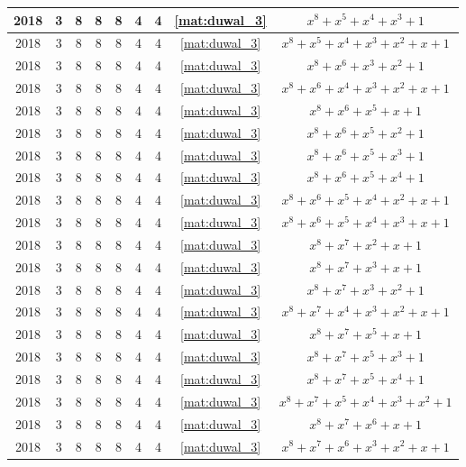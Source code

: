 \begin{longtable}{|c|c|c|c|c|c|c|c|c|}
2018 & 3 & 8 & 8 & 8 & 4 & 4 & \eqref{mat:duwal_3} & $x^8 + x^5 + x^4 + x^3 + 1$ \\ \hline 
2018 & 3 & 8 & 8 & 8 & 4 & 4 & \eqref{mat:duwal_3} & $x^8 + x^5 + x^4 + x^3 + x^2 + x + 1$ \\ \hline 
2018 & 3 & 8 & 8 & 8 & 4 & 4 & \eqref{mat:duwal_3} & $x^8 + x^6 + x^3 + x^2 + 1$ \\ \hline 
2018 & 3 & 8 & 8 & 8 & 4 & 4 & \eqref{mat:duwal_3} & $x^8 + x^6 + x^4 + x^3 + x^2 + x + 1$ \\ \hline 
2018 & 3 & 8 & 8 & 8 & 4 & 4 & \eqref{mat:duwal_3} & $x^8 + x^6 + x^5 + x + 1$ \\ \hline 
2018 & 3 & 8 & 8 & 8 & 4 & 4 & \eqref{mat:duwal_3} & $x^8 + x^6 + x^5 + x^2 + 1$ \\ \hline 
2018 & 3 & 8 & 8 & 8 & 4 & 4 & \eqref{mat:duwal_3} & $x^8 + x^6 + x^5 + x^3 + 1$ \\ \hline 
2018 & 3 & 8 & 8 & 8 & 4 & 4 & \eqref{mat:duwal_3} & $x^8 + x^6 + x^5 + x^4 + 1$ \\ \hline 
2018 & 3 & 8 & 8 & 8 & 4 & 4 & \eqref{mat:duwal_3} & $x^8 + x^6 + x^5 + x^4 + x^2 + x + 1$ \\ \hline 
2018 & 3 & 8 & 8 & 8 & 4 & 4 & \eqref{mat:duwal_3} & $x^8 + x^6 + x^5 + x^4 + x^3 + x + 1$ \\ \hline 
2018 & 3 & 8 & 8 & 8 & 4 & 4 & \eqref{mat:duwal_3} & $x^8 + x^7 + x^2 + x + 1$ \\ \hline 
2018 & 3 & 8 & 8 & 8 & 4 & 4 & \eqref{mat:duwal_3} & $x^8 + x^7 + x^3 + x + 1$ \\ \hline 
2018 & 3 & 8 & 8 & 8 & 4 & 4 & \eqref{mat:duwal_3} & $x^8 + x^7 + x^3 + x^2 + 1$ \\ \hline 
2018 & 3 & 8 & 8 & 8 & 4 & 4 & \eqref{mat:duwal_3} & $x^8 + x^7 + x^4 + x^3 + x^2 + x + 1$ \\ \hline 
2018 & 3 & 8 & 8 & 8 & 4 & 4 & \eqref{mat:duwal_3} & $x^8 + x^7 + x^5 + x + 1$ \\ \hline 
2018 & 3 & 8 & 8 & 8 & 4 & 4 & \eqref{mat:duwal_3} & $x^8 + x^7 + x^5 + x^3 + 1$ \\ \hline 
2018 & 3 & 8 & 8 & 8 & 4 & 4 & \eqref{mat:duwal_3} & $x^8 + x^7 + x^5 + x^4 + 1$ \\ \hline 
2018 & 3 & 8 & 8 & 8 & 4 & 4 & \eqref{mat:duwal_3} & $x^8 + x^7 + x^5 + x^4 + x^3 + x^2 + 1$ \\ \hline 
2018 & 3 & 8 & 8 & 8 & 4 & 4 & \eqref{mat:duwal_3} & $x^8 + x^7 + x^6 + x + 1$ \\ \hline 
2018 & 3 & 8 & 8 & 8 & 4 & 4 & \eqref{mat:duwal_3} & $x^8 + x^7 + x^6 + x^3 + x^2 + x + 1$ \\ \hline 

\end{longtable}
